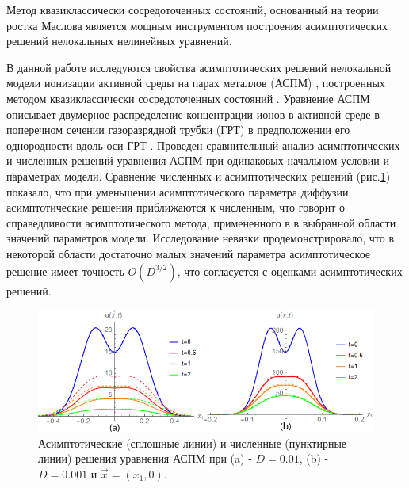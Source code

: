 
Метод квазиклассически сосредоточенных состояний, основанный на теории ростка Маслова является мощным инструментом построения асимптотических решений нелокальных нелинейных уравнений.

В данной работе исследуются свойства асимптотических решений нелокальной модели ионизации активной среды на парах металлов (АСПМ) \cite{Little}, построенных методом квазиклассически сосредоточенных состояний \cite{ShKulSin}. Уравнение АСПМ описывает двумерное распределение концентрации ионов в активной среде в поперечном сечении газоразрядной трубки (ГРТ) в предположении его однородности вдоль оси ГРТ \cite{CarBrPip}.  Проведен сравнительный анализ асимптотических и численных решений уравнения АСПМ при одинаковых начальном условии и параметрах модели. Сравнение численных и асимптотических решений (рис.\ref{fig1}) показало, что при уменьшении асимптотического параметра диффузии асимптотические решения приближаются к численным, что говорит о справедливости асимптотического метода, примененного в  \cite{ShKulSin} в выбранной области значений параметров модели. Исследование невязки продемонстрировало, что в некоторой области достаточно малых значений параметра   асимптотическое решение имеет точность $O(D^{3/2})$, что согласуется с оценками асимптотических решений.




\begin{figure}[htb]
  \centering
  
  \begin{center}
    \includegraphics[width=0.8\linewidth]{D01Resh.png}
  \end{center}
  \caption{Асимптотические (сплошные линии) и численные (пунктирные линии) решения уравнения АСПМ при (a) - $D=0.01$, (b) - $D=0.001$ и $\Vec{x}=(x_1,0)$.}\label{fig1}
\end{figure}


